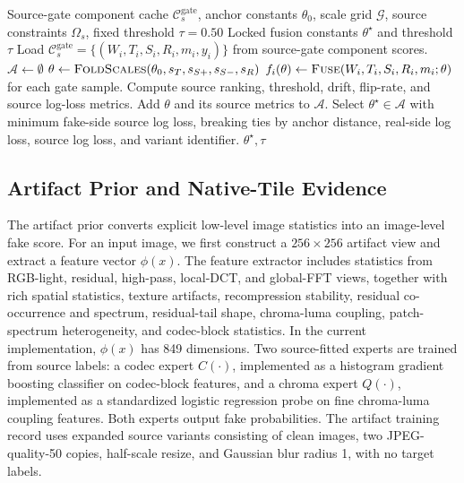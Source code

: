 \documentclass[lettersize,journal]{IEEEtran}
\begin{document}
\begin{algorithm}[t]
\caption{Source-only fusion calibration}
\label{alg:source_locking}
\begin{algorithmic}[1]
\REQUIRE Source-gate component cache $\mathcal{C}_{s}^{\mathrm{gate}}$, anchor constants $\theta_0$, scale grid $\mathcal{G}$, source constraints $\Omega_s$, fixed threshold $\tau=0.50$
\ENSURE Locked fusion constants $\theta^\star$ and threshold $\tau$
\STATE Load $\mathcal{C}_{s}^{\mathrm{gate}}=\{(W_i,T_i,S_i,R_i,m_i,y_i)\}$ from source-gate component scores.
\STATE $\mathcal{A}\leftarrow\emptyset$
    \STATE $\theta\leftarrow\textsc{FoldScales}(\theta_0,s_T,s_{S+},s_{S-},s_R)$
    \STATE $f_i(\theta)\leftarrow\textsc{Fuse}(W_i,T_i,S_i,R_i,m_i;\theta)$ for each gate sample.
    \STATE Compute source ranking, threshold, drift, flip-rate, and source log-loss metrics.
        \STATE Add $\theta$ and its source metrics to $\mathcal{A}$.
    \ENDIF
\ENDFOR
\STATE Select $\theta^\star\in\mathcal{A}$ with minimum fake-side source log loss, breaking ties by anchor distance, real-side log loss, source log loss, and variant identifier.
\RETURN $\theta^\star,\tau$
\end{algorithmic}
\end{algorithm}

\subsection{Artifact Prior and Native-Tile Evidence}
\label{sec:method_artifact}

The artifact prior converts explicit low-level image statistics into an image-level fake score. For an input image, we first construct a $256 \times 256$ artifact view and extract a feature vector $\phi(x)$. The feature extractor includes statistics from RGB-light, residual, high-pass, local-DCT, and global-FFT views, together with rich spatial statistics, texture artifacts, recompression stability, residual co-occurrence and spectrum, residual-tail shape, chroma-luma coupling, patch-spectrum heterogeneity, and codec-block statistics. In the current implementation, $\phi(x)$ has 849 dimensions. Two source-fitted experts are trained from source labels: a codec expert $C(\cdot)$, implemented as a histogram gradient boosting classifier on codec-block features, and a chroma expert $Q(\cdot)$, implemented as a standardized logistic regression probe on fine chroma-luma coupling features. Both experts output fake probabilities. The artifact training record uses expanded source variants consisting of clean images, two JPEG-quality-50 copies, half-scale resize, and Gaussian blur radius 1, with no target labels.
\end{document}

